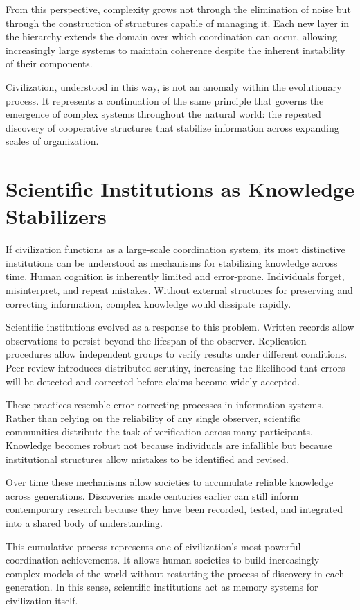 \documentclass[12pt]{article}
\begin{document}
From this perspective, complexity grows not through the elimination of noise but through the construction of structures capable of managing it. Each new layer in the hierarchy extends the domain over which coordination can occur, allowing increasingly large systems to maintain coherence despite the inherent instability of their components.

Civilization, understood in this way, is not an anomaly within the evolutionary process. It represents a continuation of the same principle that governs the emergence of complex systems throughout the natural world: the repeated discovery of cooperative structures that stabilize information across expanding scales of organization.

\section{Scientific Institutions as Knowledge Stabilizers}

If civilization functions as a large-scale coordination system, its most distinctive institutions can be understood as mechanisms for stabilizing knowledge across time. Human cognition is inherently limited and error-prone. Individuals forget, misinterpret, and repeat mistakes. Without external structures for preserving and correcting information, complex knowledge would dissipate rapidly.

Scientific institutions evolved as a response to this problem. Written records allow observations to persist beyond the lifespan of the observer. Replication procedures allow independent groups to verify results under different conditions. Peer review introduces distributed scrutiny, increasing the likelihood that errors will be detected and corrected before claims become widely accepted.

These practices resemble error-correcting processes in information systems. Rather than relying on the reliability of any single observer, scientific communities distribute the task of verification across many participants. Knowledge becomes robust not because individuals are infallible but because institutional structures allow mistakes to be identified and revised.

Over time these mechanisms allow societies to accumulate reliable knowledge across generations. Discoveries made centuries earlier can still inform contemporary research because they have been recorded, tested, and integrated into a shared body of understanding.

This cumulative process represents one of civilization's most powerful coordination achievements. It allows human societies to build increasingly complex models of the world without restarting the process of discovery in each generation. In this sense, scientific institutions act as memory systems for civilization itself.
\end{document}
